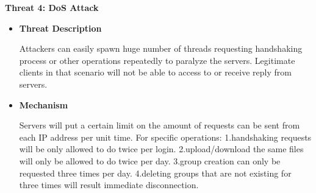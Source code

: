 \documentclass[letterpaper,11pt]{article}
\newcommand{\resheading}[1]{{\large \colorbox{mygrey}{\begin{minipage}{\textwidth}{\textbf{#1 \vphantom{p\^{E}}}}\end{minipage}}}}
\begin{document}
    	\newpage
        \resheading{Threat 4: DoS Attack}
        \vspace{0.1in}
        \begin{itemize}[noitemsep,topsep=0pt,parsep=1pt,partopsep=1pt]
        	\item\textbf{Threat Description}
        	\begin{flushleft}
				Attackers can easily spawn huge number of threads requesting handshaking process or other operations repeatedly to paralyze the servers. Legitimate clients in that scenario will not be able to access to or receive reply from servers.  
        	\end{flushleft}
        	\item\textbf{Mechanism}
        	\begin{flushleft}
        		Servers will put a certain limit on the amount of requests can be sent from each IP address per unit time. For specific operations: 1.handshaking requests will be only allowed to do twice per login. 2.upload/download the same files will only be allowed to do twice per day. 3.group creation can only be requested three times per day. 4.deleting groups that are not existing for three times will result immediate disconnection.      
        	\end{flushleft}
        \end{itemize}
\end{document}

